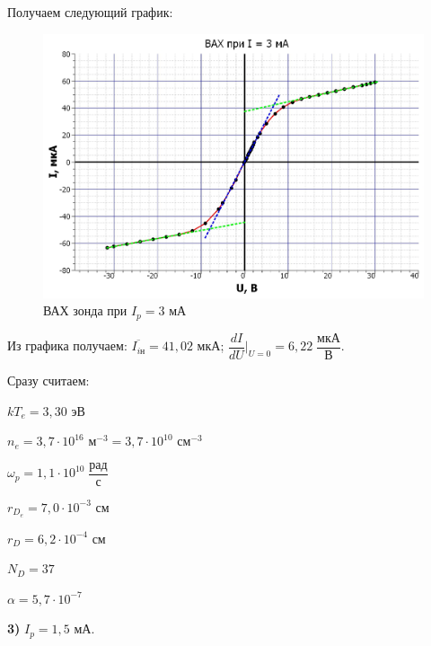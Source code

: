 \documentclass[a4paper,12pt]{article} %
\begin{document}
Получаем следующий график:

\newpage


\begin{figure}[h!]
	\centering
	\includegraphics[scale=0.69]{Pictures/ВАХ_3.jpg}
	\caption{ВАХ зонда при $I_p = 3$ мА}
\end{figure}

Из графика получаем:
$\overline{I_{i\text{н}}} = 41,02$ мкА;  $\dfrac{dI}{dU}\bigg|_{U = 0} = 6,22\;\dfrac{\text{мкА}}{\text{В}}$.

Сразу считаем:

$\boxed{kT_e = 3,30\text{ эВ}}$
\vspace{3mm}

$\boxed{n_e = 3,7\cdot 10^{16} \text{ м}^{-3} = 3,7\cdot 10^{10} \text{ см}^{-3}}$
\vspace{3mm}

$\boxed{\omega_p = 1,1\cdot 10^{10} \; \dfrac{\text{рад}}{\text{с}}}$
\vspace{3mm}

$\boxed{r_{D_e} = 7,0\cdot 10^{-3}\text{ см}}$
\vspace{3mm}

$\boxed{r_D = 6,2\cdot 10^{-4}\text{ см}}$
\vspace{3mm}

$\boxed{N_D = 37}$
\vspace{3mm}

$\boxed{\alpha = 5,7\cdot 10^{-7}}$


\newpage

\textbf{3)} $I_p = 1,5$ мА.
\end{document}
